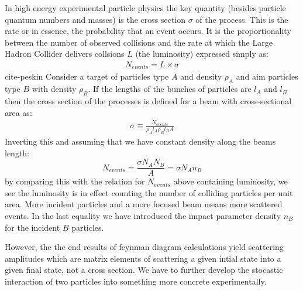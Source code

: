 In high energy experimental particle physics the key quantity (besides particle quantum numbers and masses) is the
cross section $\sigma$ of the process. This is the rate or in essence, the probability that an event occurs. It is the proportionality between the number of observed collisions and the rate at which the Large Hadron Collider
 delivers collsions $L$ (the luminosity)  expressed simply as:
\begin{align*}
N_{events} = L \times \sigma
\end{align*}
cite-peskin
Consider a target of particles type $A$ and density $\rho_A$ and aim particles type 
$B$ with density $\rho_B$. If the lengths of the bunches of particles are $l_A$ and $l_B$ 
then the cross section of the processes is defined for a beam with cross-sectional area as:
\begin{align*}
\sigma \equiv \frac{N_{events}}{\rho_A l_A \rho_B l_B A}
\end{align*}
Inverting this and assuming that we have constant density along the beams length:
\begin{equation}\label{eq:sigma}
N_{events} = \frac{\sigma N_A N_B}{A} = \sigma{N_A n_B}
\end{equation}
by comparing this with the relation for $N_{events}$ above containing luminosity, we see the
 luminosity is in effect counting the number of colliding particles per unit area.
 More incident particles and a more focused beam means more scattered events. 
In the last equality we have introduced the impact parameter density $n_B$ for
 the incident $B$ particles.

However, the the end results of feynman diagram calculations yield scattering amplitudes
which are matrix elements of scattering a given intial state into a given final state, not
a cross section. We have to further develop the stocastic interaction of two particles into
something more concrete experimentally.
 
